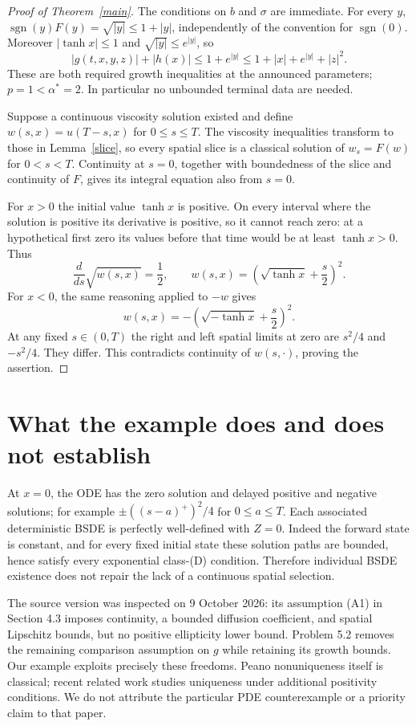 \documentclass[11pt]{article}
\DeclareMathOperator{\sgn}{sgn}
\begin{document}
\begin{proof}[Proof of Theorem~\ref{main}]
The conditions on $b$ and $\sigma$ are immediate. For every $y$,
$\sgn(y)F(y)=\sqrt{|y|}\leq1+|y|$, independently of the convention
for $\sgn(0)$. Moreover $|\tanh x|\leq1$ and
$\sqrt{|y|}\leq e^{|y|}$, so
\[
 |g(t,x,y,z)|+|h(x)|\leq1+e^{|y|}
 \leq1+|x|+e^{|y|}+|z|^2.
\]
These are both required growth inequalities at the announced parameters;
$p=1<\alpha^*=2$. In particular no unbounded terminal data are needed.

Suppose a continuous viscosity solution existed and define
$w(s,x)=u(T-s,x)$ for $0\leq s\leq T$.
The viscosity inequalities transform to those in Lemma~\ref{slice},
so every spatial slice is a classical solution of $w_s=F(w)$ for
$0<s<T$. Continuity at $s=0$, together with boundedness of the slice
and continuity of $F$, gives its integral equation also from $s=0$.

For $x>0$ the initial value $\tanh x$ is positive. On every interval
where the solution is positive its derivative is positive, so it cannot
reach zero: at a hypothetical first zero its values before that time
would be at least $\tanh x>0$. Thus
\[
 \frac{d}{ds}\sqrt{w(s,x)}=\frac12,
 \qquad w(s,x)=\left(\sqrt{\tanh x}+\frac{s}{2}\right)^2.
\]
For $x<0$, the same reasoning applied to $-w$ gives
\[
 w(s,x)=-\left(\sqrt{-\tanh x}+\frac{s}{2}\right)^2.
\]
At any fixed $s\in(0,T)$ the right and left spatial limits at zero
are $s^2/4$ and $-s^2/4$. They differ. This contradicts continuity of
$w(s,\cdot)$, proving the assertion.
\end{proof}

\section{What the example does and does not establish}
At $x=0$, the ODE has the zero solution and delayed positive and negative
solutions; for example $\pm((s-a)^+)^2/4$ for $0\leq a\leq T$.
Each associated deterministic BSDE is perfectly well-defined with $Z=0$.
Indeed the forward state is constant, and for every fixed initial state
these solution paths are bounded, hence satisfy every exponential
class-(D) condition. Therefore individual BSDE existence does not repair
the lack of a continuous spatial selection.

The source version was inspected on 9 October 2026: its assumption (A1)
in Section 4.3 imposes continuity, a bounded diffusion coefficient, and
spatial Lipschitz bounds, but no positive ellipticity lower bound.
Problem 5.2 removes the remaining comparison assumption on $g$ while
retaining its growth bounds. Our example exploits precisely these freedoms.
Peano nonuniqueness itself is classical; recent related work
\cite{Peano} studies uniqueness under additional positivity conditions.
We do not attribute the particular PDE counterexample or a priority claim
to that paper.
\end{document}
